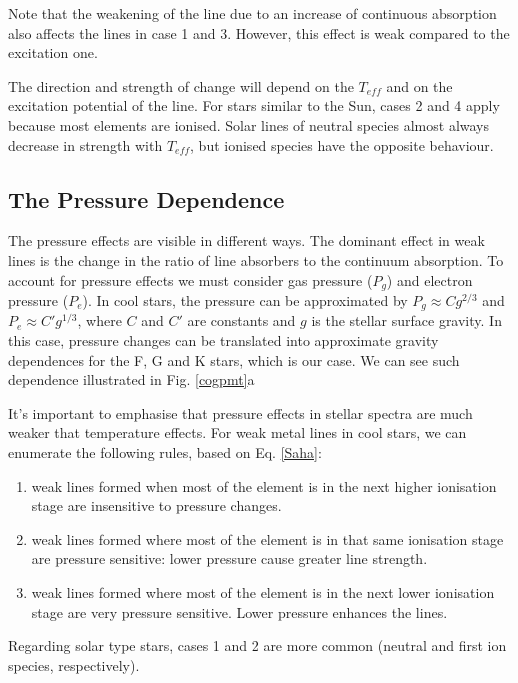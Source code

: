 \documentclass[dvips,12pt,a4paper]{report}
\begin{document}
{Note that the weakening of the line due to an increase of continuous absorption also affects the lines in case 1 and 3. However, this effect is weak compared to the excitation one.

The direction and strength of change will depend on the $T_{eff}$ and on the excitation potential of the line. For stars similar to the Sun, cases 2 and 4 apply because most elements are ionised. Solar lines of neutral species almost always decrease in strength with $T_{eff}$, but ionised species have the opposite behaviour. 

\subsection{The Pressure Dependence}

The pressure effects are visible in different ways. The dominant effect in weak lines is the change in the ratio of line absorbers to the continuum absorption. To account for pressure effects we must consider gas pressure ($P_g$) and electron pressure ($P_e$). In cool stars, the pressure can be approximated by $P_g\approx C g^{2/3}$ and $P_e\approx C' g^{1/3}$, where $C$ and $C'$ are constants and $g$ is the stellar surface gravity. In this case, pressure changes can be translated into approximate gravity dependences for the F, G and K stars, which is our case. We can see such dependence illustrated in Fig. \ref{cogpmt}a 

It's important to emphasise that pressure effects in stellar spectra are much weaker that temperature effects. For weak metal lines in cool stars, we can enumerate the following rules, based on Eq. \ref{Saha}:

\begin{enumerate}
 \item weak lines formed when most of the element is in the next higher ionisation stage are insensitive to pressure changes.
\item weak lines formed where most of the element is in that same ionisation stage are pressure sensitive: lower pressure cause greater line strength.
\item weak lines formed where most of the element is in the next lower ionisation stage are very pressure sensitive. Lower pressure enhances the lines.
\end{enumerate}

Regarding solar type stars, cases 1 and 2 are more common (neutral and first ion species, respectively).

}
\end{document}
